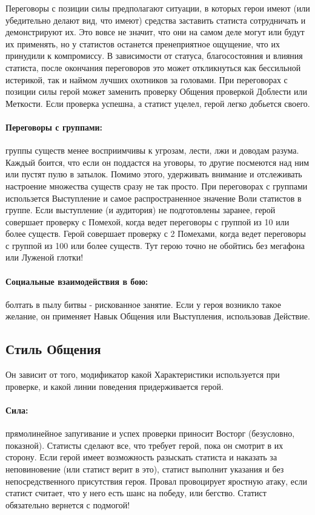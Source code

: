 Переговоры с позиции силы предполагают ситуации, в которых герои имеют (или убедительно делают вид, что имеют) средства заставить статиста сотрудничать и демонстрируют их. Это вовсе не значит, что они на самом деле могут или будут их применять, но у статистов останется пренеприятное ощущение, что их принудили к компромиссу. В зависимости от статуса, благосостояния и влияния статиста, после окончания переговоров это может откликнуться как бессильной истерикой, так и наймом лучших охотников за головами.
\newline При переговорах с позиции силы герой может заменить проверку Общения проверкой Доблести или Меткости. Если проверка успешна, а статист уцелел, герой легко добьется своего.
\paragraph{Переговоры с группами:} группы существ менее восприимчивы к угрозам, лести, лжи и доводам разума. Каждый боится, что если он поддастся на уговоры, то другие посмеются над ним или пустят пулю в затылок. Помимо этого, удерживать внимание и отслеживать настроение множества существ сразу не так просто. 
\newline При переговорах с группами использется Выступление и самое распространенное значение Воли статистов в группе. Если выступление (и аудитория) не подготовлены заранее, герой совершает проверку с Помехой, когда ведет переговоры с группой из 10 или более существ. Герой совершает проверку с 2 Помехами, когда ведет переговоры с группой из 100 или более существ. Тут герою точно не обойтись без мегафона или Луженой глотки!
\paragraph{Социальные взаимодействия в бою:} болтать в пылу битвы - рискованное занятие. Если у героя возникло такое желание, он применяет Навык Общения или Выступления, использовав Действие.

\subsection{Стиль Общения}
Он зависит от того, модификатор какой Характеристики используется при проверке, и какой линии поведения придерживается герой.
\paragraph{Сила:} прямолинейное запугивание и успех проверки приносит Восторг (безусловно, показной). Статисты сделают все, что требует герой, пока он смотрит в их сторону. Если герой имеет возможность разыскать статиста и наказать за неповиновение (или статист верит в это), статист выполнит указания и без непосредственного присутствия героя.
\newline Провал провоцирует яростную атаку, если статист считает, что у него есть шанс на победу, или бегство. Статист обязательно вернется с подмогой!
